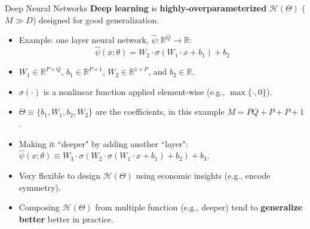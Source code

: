 \documentclass[aspectratio=169,10pt]{beamer}
\newcommand{\emphcolor}[1]{\textbf{\textcolor{emphcolorval}{#1}}}
\newcommand{\Xdom}{\mathcal{X}}
\begin{document}

\begin{frame}{Deep Neural Networks}
	\emphcolor{Deep learning} is \emphcolor{highly-overparameterized} $\mathcal{H}(\Theta)$ ($M\gg D$) designed for good generalization.
	\begin{itemize}

		\item Example: one layer neural network, $\hat{\psi} : \mathbb{R}^Q\rightarrow \mathbb{R}$:
		\begin{equation*}
			\hat{\psi}(x;\theta) = W_2 \cdot \sigma \left(W_1\cdot x+b_1\right)+b_2
		\end{equation*}
		\vspace{0.1in}
		\item $W_1\in \mathbb{R}^{P\times Q}$, $b_1\in \mathbb{R}^{P\times 1}$, $W_2 \in \mathbb{R}^{1\times P}$, and $b_2 \in \mathbb{R}$.
		\vspace{0.1in} 
		\item $\sigma(\cdot)$ is a nonlinear function applied element-wise (e.g., $\max\{\cdot,0\}$).
		\vspace{0.1in}
		\item $\Theta \equiv \{b_1,W_1,b_2,W_2\}$ are the coefficients, in this example $M = PQ+P+P+1$.\vspace{0.1in}
		\item Making it ``deeper" by adding another ``layer":
			$\hat{\psi}(x;\theta)\equiv W_3\cdot\sigma(W_2 \cdot \sigma(W_1 \cdot x + b_1) + b_2)+b_3.$
	\end{itemize}	
\begin{itemize}
	\item Very flexible to design $\mathcal{H}(\Theta)$ using economic insights (e.g., encode symmetry).\vspace{0.1in}
	\item Composing $\mathcal{H}(\Theta)$ from multiple function (e.g., deeper) tend to \emphcolor{generalize better} better in practice.\vspace{0.1in}
\end{itemize}
\end{frame}
\end{document}
